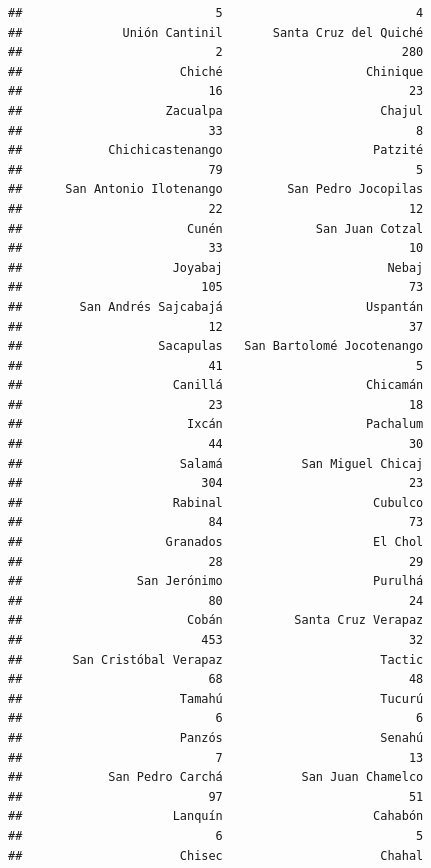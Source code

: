 \documentclass[
]{article}
\begin{document}
\begin{verbatim}
##                           5                           4 
##              Unión Cantinil       Santa Cruz del Quiché 
##                           2                         280 
##                      Chiché                    Chinique 
##                          16                          23 
##                    Zacualpa                      Chajul 
##                          33                           8 
##            Chichicastenango                     Patzité 
##                          79                           5 
##      San Antonio Ilotenango         San Pedro Jocopilas 
##                          22                          12 
##                       Cunén             San Juan Cotzal 
##                          33                          10 
##                     Joyabaj                       Nebaj 
##                         105                          73 
##        San Andrés Sajcabajá                    Uspantán 
##                          12                          37 
##                   Sacapulas   San Bartolomé Jocotenango 
##                          41                           5 
##                     Canillá                    Chicamán 
##                          23                          18 
##                       Ixcán                    Pachalum 
##                          44                          30 
##                      Salamá           San Miguel Chicaj 
##                         304                          23 
##                     Rabinal                     Cubulco 
##                          84                          73 
##                    Granados                     El Chol 
##                          28                          29 
##                San Jerónimo                     Purulhá 
##                          80                          24 
##                       Cobán          Santa Cruz Verapaz 
##                         453                          32 
##       San Cristóbal Verapaz                      Tactic 
##                          68                          48 
##                      Tamahú                      Tucurú 
##                           6                           6 
##                      Panzós                      Senahú 
##                           7                          13 
##            San Pedro Carchá           San Juan Chamelco 
##                          97                          51 
##                     Lanquín                     Cahabón 
##                           6                           5 
##                      Chisec                      Chahal 

\end{verbatim}
\end{document}

